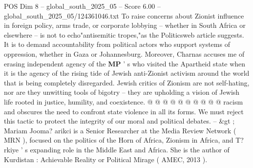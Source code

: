 \begin{textsample}{POS Dim 8 – global\_south\_2025\_05 – Score 6.00 – global\_south\_2025\_05/124361046.txt}
To raise concerns about Zionist influence in foreign policy, arms trade, or corporate lobbying -- whether in South Africa or elsewhere -- is not to echo"antisemitic tropes,"as the Politicsweb article suggests.
It is to demand accountability from political actors who support systems of oppression, whether in Gaza or Johannesburg.
Moreover, Charnas accuses me of erasing independent agency of the \textbf{MP} ' s who visited the Apartheid state when it is the agency of the rising tide of Jewish anti-Zionist activism around the world that is being completely disregarded.
Jewish critics of Zionism are not self-hating, nor are they unwitting tools of bigotry -- they are upholding a vision of Jewish life rooted in justice, humility, and coexistence. @ @ @ @ @ @ @ @ @ @ racism and obscures the need to confront state violence in all its forms.
We must reject this tactic to protect the integrity of our moral and political debates. -- \&gt ; Mariam Jooma? arikci is a Senior Researcher at the Media Review Network ( MRN ), focused on the politics of the Horn of Africa, Zionism in Africa, and T? rkiye ' s expanding role in the Middle East and Africa.
She is the author of Kurdistan : Achievable Reality or Political Mirage ( AMEC, 2013 ).

\end{textsample}
